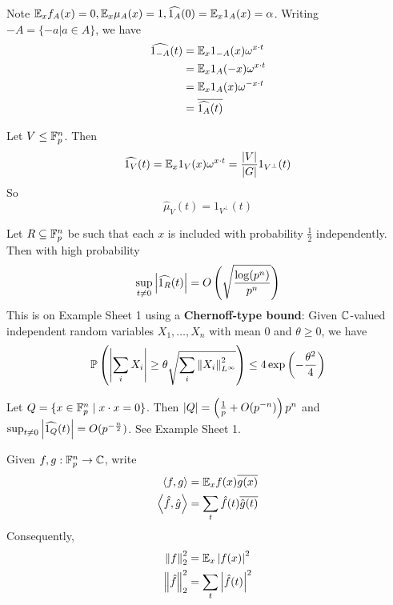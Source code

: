 \documentclass{article}
\begin{document}
Note $\mathbb E_x f_A(x) = 0, \mathbb E_x \mu_A(x) = 1, \widehat{1_A}(0) = \mathbb E_x 1_A(x) = \alpha$. Writing $-A = \{-a | a \in A\}$, we have
\begin{align*}
  \widehat{1_{-A}}(t)
  & = \mathbb E_x 1_{-A}(x) \omega^{x \cdot t} \\
  & = \mathbb E_x 1_A(-x) \omega^{x \cdot t} \\
  & = \mathbb E_x 1_A(x) \omega^{-x \cdot t} \\
  & = \overline{\widehat{1_A}(t)}
\end{align*}

\begin{nex}\label{ex:dft-subspace}
  Let $V \le \mathbb F_p^n$. Then
  $$\widehat{1_V}(t) = \mathbb E_x 1_V(x) \omega^{x \cdot t} = \frac{\left\lvert V\right\rvert}{\left\lvert G\right\rvert} 1_{V^\perp}(t)$$
  So
  $$\hat \mu_V(t) = 1_{V^\perp}(t)$$
\end{nex}

\begin{nex}
  Let $R \subseteq \mathbb F_p^n$ be such that each $x$ is included with probability $\frac 12$ independently. Then with high probability
  $$\sup_{t \ne 0} \left\lvert \widehat{1_R}(t)\right\rvert = O\left(\sqrt{\frac{\log(p^n)}{p^n}}\right)$$
  This is on Example Sheet 1 using a {\bf Chernoff-type bound}: Given $\mathbb C$-valued independent random variables $X_1, \dots, X_n$ with mean $0$ and $\theta \ge 0$, we have
  $$\mathbb P\left(\left\lvert \sum_i X_i\right\rvert \ge \theta\sqrt{\sum_i \left\lVert X_i\right\rVert^2_{L^\infty}}\right) \le 4\exp\left(-\frac{\theta^2}4\right)$$
\end{nex}

\begin{nex}
  Let $Q = \{x \in \mathbb F_p^n \mid x \cdot x = 0\}$. Then $\left\lvert Q\right\rvert = \left(\frac 1p + O(p^{-n})\right)p^n$ and $\sup_{t \ne 0} \left\lvert \widehat{1_Q}(t)\right\rvert = O(p^{-\frac n2})$. See Example Sheet 1.
\end{nex}

\begin{notation}
  Given $f, g : \mathbb F_p^n \to \mathbb C$, write
  \begin{align*}
    \left\langle f, g\right\rangle & = \mathbb E_x f(x) \overline{g(x)} \\
    \left\langle \hat f, \hat g\right\rangle & = \sum_t \hat f(t) \overline{\hat g(t)}
  \end{align*}
  Consequently,
  \begin{align*}
    \left\lVert f\right\rVert_2^2 & = \mathbb E_x \left\lvert f(x)\right\rvert^2 \\
    \left\lVert \hat f\right\rVert_2^2 & = \sum_t \left\lvert \hat f(t)\right\rvert^2
  \end{align*}
\end{notation}
\end{document}
